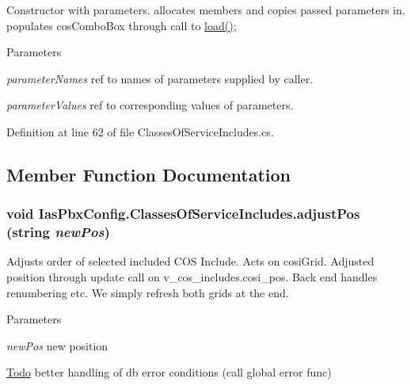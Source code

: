 Constructor with parameters. allocates members and copies passed parameters in. populates cosComboBox through call to \hyperlink{class_ias_pbx_config_1_1_classes_of_service_includes_afba25c0ca7c6b26bcd5e8b6984758908}{load()}; 
\begin{DoxyParams}{Parameters}
\item[{\em parameterNames}]ref to names of parameters supplied by caller. \item[{\em parameterValues}]ref to corresponding values of parameters. \end{DoxyParams}


Definition at line 62 of file ClassesOfServiceIncludes.cs.

\subsection{Member Function Documentation}
\hypertarget{class_ias_pbx_config_1_1_classes_of_service_includes_a1a77c41288db274dbe205da6b34ccb1f}{
\subsubsection[{adjustPos}]{\setlength{\rightskip}{0pt plus 5cm}void IasPbxConfig.ClassesOfServiceIncludes.adjustPos (string {\em newPos})}}
\label{class_ias_pbx_config_1_1_classes_of_service_includes_a1a77c41288db274dbe205da6b34ccb1f}


Adjusts order of selected included COS Include. Acts on cosiGrid. Adjusted position through update call on v\_\-cos\_\-includes.cosi\_\-pos. Back end handles renumbering etc. We simply refresh both grids at the end. 
\begin{DoxyParams}{Parameters}
\item[{\em newPos}]new position \end{DoxyParams}
\begin{Desc}
\item[\hyperlink{todo__todo000009}{Todo}]better handling of db error conditions (call global error func) \end{Desc}


